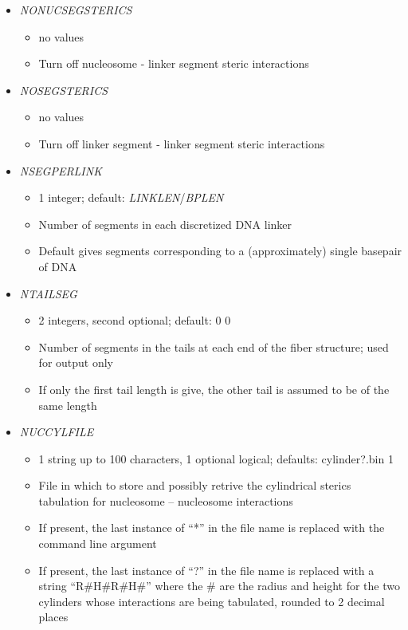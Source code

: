 \documentclass[12pt,dvips]{article}
\begin{document}
\begin{itemize}
%
\item {\it NONUCSEGSTERICS}
  \begin{itemize}
    \item no values
    \item Turn off nucleosome - linker segment steric interactions
  \end{itemize}
%
\item {\it NOSEGSTERICS}
  \begin{itemize}
    \item no values
    \item Turn off linker segment - linker segment steric interactions
  \end{itemize}
%
\item {\it NSEGPERLINK}
  \begin{itemize}
    \item 1 integer; default: {\em LINKLEN}/{\em BPLEN}
    \item Number of segments in each discretized DNA linker
    \item Default gives segments corresponding to a (approximately) single basepair of DNA
  \end{itemize}
%
\item {\it NTAILSEG}
  \begin{itemize}
    \item 2 integers, second optional; default: 0 0 
    \item Number of segments in the tails at each end of the fiber structure; used for output only
    \item If only the first tail length is give, the other tail is assumed to be of the same length
  \end{itemize}
%
\item {\it NUCCYLFILE}
  \begin{itemize}
    \item 1 string up to 100 characters, 1 optional logical; defaults: cylinder?.bin 1
    \item File in which to store and possibly retrive the cylindrical sterics tabulation for nucleosome -- nucleosome interactions
    \item If present, the last instance of ``*'' in the file name is replaced with the command line argument
    \item If present, the last instance of ``?''  in the file name is replaced with a string ``R\#H\#R\#H\#'' where the \# are the radius and height for the two cylinders whose interactions are being tabulated, rounded to 2 decimal places

\end{itemize}
\end{itemize}
\end{document}
